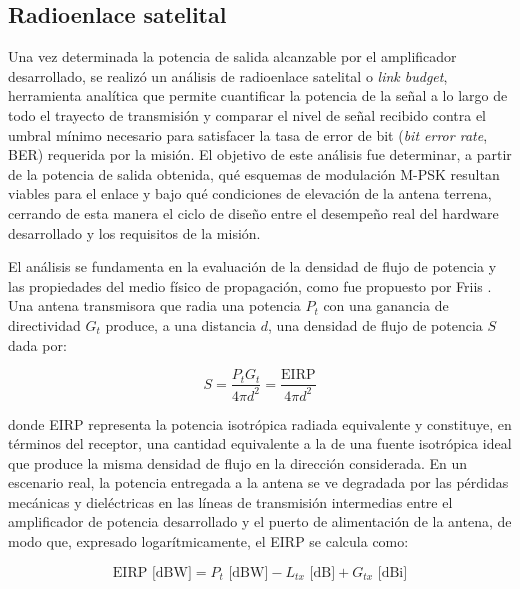 \subsection{Radioenlace satelital} \label{sec:radioenlace}
Una vez determinada la potencia de salida alcanzable por el amplificador desarrollado, se realizó un análisis de radioenlace satelital o \textit{link budget}, herramienta analítica que permite cuantificar la potencia de la señal a lo largo de todo el trayecto de transmisión y comparar el nivel de señal recibido contra el umbral mínimo necesario para satisfacer la tasa de error de bit (\textit{bit error rate}, BER) requerida por la misión. El objetivo de este análisis fue determinar, a partir de la potencia de salida obtenida, qué esquemas de modulación M-PSK resultan viables para el enlace y bajo qué condiciones de elevación de la antena terrena, cerrando de esta manera el ciclo de diseño entre el desempeño real del hardware desarrollado y los requisitos de la misión.

El análisis se fundamenta en la evaluación de la densidad de flujo de potencia y las propiedades del medio físico de propagación, como fue propuesto por Friis \cite{friis1946}. Una antena transmisora que radia una potencia $P_t$ con una ganancia de directividad $G_t$ produce, a una distancia $d$, una densidad de flujo de potencia $S$ dada por:

\begin{equation}
    S = \frac{P_t G_t}{4\pi d^2} = \frac{\text{EIRP}}{4\pi d^2}
    \label{eq:densidad_flujo}
\end{equation}

donde EIRP representa la potencia isotrópica radiada equivalente y constituye, en términos del receptor, una cantidad equivalente a la de una fuente isotrópica ideal que produce la misma densidad de flujo en la dirección considerada. En un escenario real, la potencia entregada a la antena se ve degradada por las pérdidas mecánicas y dieléctricas en las líneas de transmisión intermedias entre el amplificador de potencia desarrollado y el puerto de alimentación de la antena, de modo que, expresado logarítmicamente, el EIRP se calcula como:

\begin{equation}
    \text{EIRP [dBW]} = P_t \text{ [dBW]} - L_{tx} \text{ [dB]} + G_{tx} \text{ [dBi]}
    \label{eq:eirp_analitico}
\end{equation}

